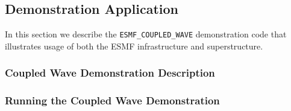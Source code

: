 \subsection{Demonstration Application}
\label{sec:demo}

In this section we describe the {\tt ESMF\_COUPLED\_WAVE} demonstration code that 
illustrates usage of both the ESMF infrastructure and superstructure. 

\subsubsection{Coupled Wave Demonstration Description}

\subsubsection{Running the Coupled Wave Demonstration}





